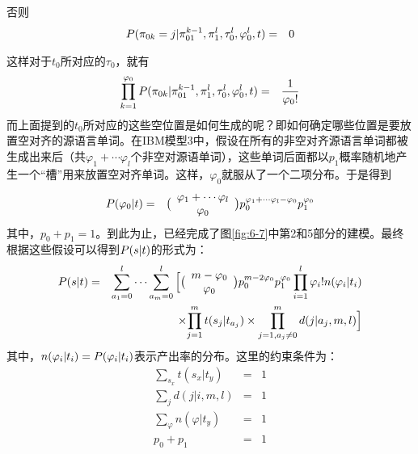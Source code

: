 否则
\begin{eqnarray}
{P}(\pi_{0k}=j|\pi_{01}^{k-1},\pi_1^l,\tau_0^l,\varphi_0^l,{t}) & = & 0
\label{eq:6-14}
\end{eqnarray}

这样对于$t_0$所对应的$\tau_0$，就有
{
\begin{eqnarray}
\prod_{k=1}^{\varphi_0}{{P}(\pi_{0k}|\pi_{01}^{k-1},\pi_{1}^{l},\tau_{0}^{l},\varphi_{0}^{l},{t})         } & = & \frac{1}{\varphi_{0}!}
\label{eq:6-15}
\end{eqnarray}
}
\parinterval 而上面提到的$t_0$所对应的这些空位置是如何生成的呢？即如何确定哪些位置是要放置空对齐的源语言单词。在IBM模型3中，假设在所有的非空对齐源语言单词都被生成出来后（共$\varphi_1+\cdots {\varphi}_l$个非空对源语单词），这些单词后面都以$p_1$概率随机地产生一个“槽”用来放置空对齐单词。这样，${\varphi}_0$就服从了一个二项分布。于是得到
{
\begin{eqnarray}
{P}(\varphi_0|{t}) & = & \big(\begin{array}{c}
\varphi_1+\cdots \varphi_l\\
\varphi_0\\
\end{array}\big)p_0^{\varphi_1+\cdots \varphi_l-\varphi_0}p_1^{\varphi_0}
\label{eq:6-16}
\end{eqnarray}
}
\noindent 其中，$p_0+p_1=1$。到此为止，已经完成了图\ref{fig:6-7}中第2和5部分的建模。最终根据这些假设可以得到${P}({s}| {t})$的形式为：
{
\begin{eqnarray}
{{P}({s}| {t})}&= &{\sum_{a_1=0}^{l}{\cdots}\sum_{a_m=0}^{l}{\Big[\big(\begin{array}{c}
m-\varphi_0\\
\varphi_0\\
\end{array}\big)}p_0^{m-2\varphi_0}p_1^{\varphi_0}\prod_{i=1}^{l}{{\varphi_i}!n(\varphi_i|t_i)    }} \nonumber \\
& & \times{\prod_{j=1}^{m}{t(s_j|t_{a_j})} \times \prod_{j=1,a_j\neq 0}^{m}{d(j|a_j,m,l)}} \Big]
\label{eq:6-17}
\end{eqnarray}
}
\noindent 其中，$n(\varphi_i |t_i)={{P}(\varphi_i|t_i)}$表示产出率的分布。这里的约束条件为：
{
\begin{eqnarray}
\sum_{s_x}t(s_x|t_y)                     & = &1 \label{eq:6-18} \\
\sum_{j}d(j|i,m,l)                & = & 1 \label{eq:6-19} \\
\sum_{\varphi} n(\varphi|t_y) & = &1 \label{eq:6-20} \\
p_0+p_1                            & = & 1 \label{eq:6-21}
\end{eqnarray}
}

